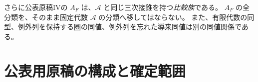 さらに公表原稿IVの $A_F$ は、$\mathcal A$ と同じ三次接錐を持つ\emph{比較族}である。
$A_F$ の全分類を、そのまま固定代数 $\mathcal A$ の分類へ移してはならない。
また、有限代数の同型、例外列を保持する圏の同値、例外列を忘れた導来同値は別の同値関係である。





























\section{公表用原稿の構成と確定範囲}

